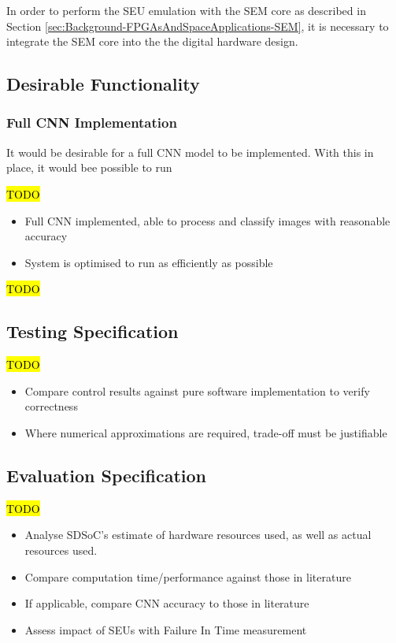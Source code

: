 \documentclass[12pt]{article}
\begin{document}
In order to perform the SEU emulation with the SEM core as described in Section \ref{sec:Background-FPGAsAndSpaceApplications-SEM}, it is necessary to integrate the SEM core into the the digital hardware design. 

\subsection{Desirable Functionality}
\label{sec:ProjSpec-Desirable}

\subsubsection{Full CNN Implementation}
\label{sec:ProjSpec-Desirable-SEM}

It would be desirable for a full CNN model to be implemented. With this in place, it would bee possible to run 

\hl{TODO}

\begin{itemize}
\item Full CNN implemented, able to process and classify images with reasonable accuracy
\item System is optimised to run as efficiently as possible
\end{itemize}

\hl{TODO}

\subsection{Testing Specification}
\label{sec:ProjSpec-TestSpec}

\hl{TODO}

\begin{itemize}
\item Compare control results against pure software implementation to verify correctness
\item Where numerical approximations are required, trade-off must be justifiable
\end{itemize}

\subsection{Evaluation Specification}
\label{sec:ProjSpec-EvalSpec}

\hl{TODO}

\begin{itemize}
\item Analyse SDSoC's estimate of hardware resources used, as well as actual resources used.
\item Compare computation time/performance against those in literature
\item If applicable, compare CNN accuracy to those in literature
\item Assess impact of SEUs with Failure In Time measurement
\end{itemize}
\end{document}
